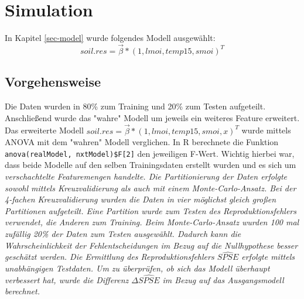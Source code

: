 \section{Simulation}
In Kapitel \ref{sec-model} wurde folgendes Modell ausgewählt:
\begin{equation}
	soil.res = \vec{\beta} * (1,lmoi,temp15,smoi)^T
\end{equation}

\subsection{Vorgehensweise}
Die Daten wurden in 80\% zum Training und 20\% zum Testen aufgeteilt.
Anschließend wurde das "wahre" Modell um jeweils ein weiteres Feature erweitert.
Das erweiterte Modell $soil.res = \vec{\beta} * (1,lmoi,temp15,smoi,x)^T$ wurde mittels ANOVA mit dem "wahren" Modell verglichen.
In R berechnete die Funktion \lstinline|anova(realModel, nxtModel)$F[2]| den jeweiligen F-Wert.
Wichtig hierbei war, dass beide Modelle auf den selben Trainingsdaten erstellt wurden und es sich um \it{verschachtelte} Featuremengen handelte.
Die Partitionierung der Daten erfolgte sowohl mittels Kreuzvalidierung als auch mit einem Monte-Carlo-Ansatz.
Bei der 4-fachen Kreuzvalidierung wurden die Daten in vier möglichst gleich großen Partitionen aufgeteilt.
Eine Partition wurde zum Testen des Reproduktionsfehlers verwendet, die Anderen zum Training.
Beim Monte-Carlo-Ansatz wurden 100 mal zufällig 20\% der Daten zum Testen ausgewählt.
Dadurch kann die Wahrscheinlichkeit der Fehlentscheidungen im Bezug auf die Nullhypothese besser geschätzt werden.
Die Ermittlung des Reproduktionsfehlers $\widehat{SPSE}$ erfolgte mittels unabhängigen Testdaten.
Um zu überprüfen, ob sich das Modell überhaupt verbessert hat, wurde die Differenz $\Delta \widehat{SPSE}$ im Bezug auf das Ausgangsmodell berechnet.

